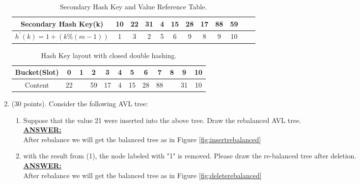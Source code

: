 \documentclass{article}
\newcommand{\answer}{\textbf{\\\underline{ANSWER:}\\}}
\begin{document}
\begin{enumerate}
\begin{table}[H]
  \begin{center}
    \begin{tabular}{|c|c|c|c|c|c|c|c|c|c|c|c|} 
      \hline Secondary Hash Key(k) &10&22&31&4&15&28&17&88&59 \\
      \hline $h^\prime(k)=1+(k\%(m-1))$&1&3&2&5&6&9&8&9&10 \\
      \hline
    \end{tabular}
    \caption{Secondary Hash Key and Value Reference Table. \label{tbl:sechashvalue}} 
    \vspace{-15pt}
  \end{center}
\end{table}

\begin{table}[H]
  \begin{center}
    \begin{tabular}{|c|c|c|c|c|c|c|c|c|c|c|c|} 
      \hline Bucket(Slot)&0&1&2&3&4&5&6&7&8&9&10 \\
      \hline 
      Content &22& &59&17&4&15&28&88& &31&10 \\
      \hline
    \end{tabular}
    \caption{Hash Key layout with closed double
      hashing. \label{tbl:doublehash}} 
    \vspace{-15pt}
  \end{center}
\end{table}


\item(30 points). Consider the following AVL tree:\\


\begin{enumerate}[(1)]
\item Suppose that the value 21 were inserted into the above tree.
  Draw the rebalanced AVL tree. 
\answer After rebalance we will get the balanced tree as in Figure
\ref{fig:insertrebalanced}


\item with the result from (1), the node labeled with "1" is
  removed. Please draw the re-balanced tree after deletion.
\answer After rebalance we will get the balanced tree as in Figure
\ref{fig:deleterebalanced}



\end{enumerate}                 %

\end{enumerate}                 %
\end{document}
